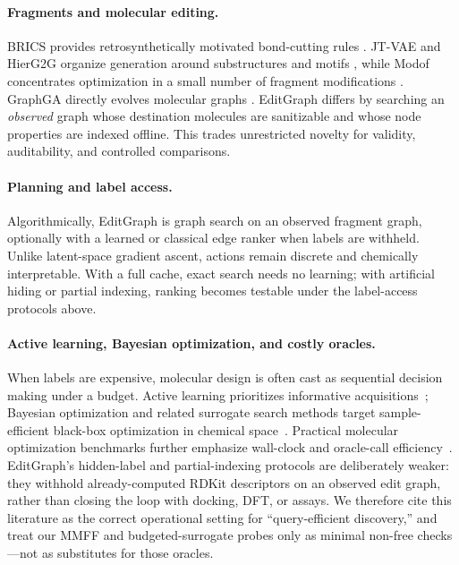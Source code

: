\documentclass[journal=jcisd8,manuscript=article,email=false]{achemso}
\begin{document}
\paragraph{Fragments and molecular editing.}
BRICS provides retrosynthetically motivated bond-cutting rules \citep{degen2008brics}. JT-VAE and HierG2G organize generation around substructures and motifs \citep{jin2018jtvae,jin2020hierg2g}, while Modof concentrates optimization in a small number of fragment modifications \citep{chen2021modof}. GraphGA directly evolves molecular graphs \citep{jensen2019graphga}. EditGraph differs by searching an \emph{observed} graph whose destination molecules are sanitizable and whose node properties are indexed offline. This trades unrestricted novelty for validity, auditability, and controlled comparisons.

\paragraph{Planning and label access.}
Algorithmically, EditGraph is graph search on an observed fragment graph, optionally with a learned or classical edge ranker when labels are withheld. Unlike latent-space gradient ascent, actions remain discrete and chemically interpretable. With a full cache, exact search needs no learning; with artificial hiding or partial indexing, ranking becomes testable under the label-access protocols above.

\paragraph{Active learning, Bayesian optimization, and costly oracles.}
When labels are expensive, molecular design is often cast as sequential decision making under a budget. Active learning prioritizes informative acquisitions~\citep{settles2009active,reker2015active,graff2021accelerating}; Bayesian optimization and related surrogate search methods target sample-efficient black-box optimization in chemical space~\citep{hernandez2017parallel,korovina2020chembo,griffiths2020constrained,tripp2021sample}. Practical molecular optimization benchmarks further emphasize wall-clock and oracle-call efficiency~\citep{gao2022pmo}. EditGraph's hidden-label and partial-indexing protocols are deliberately weaker: they withhold already-computed RDKit descriptors on an observed edit graph, rather than closing the loop with docking, DFT, or assays. We therefore cite this literature as the correct operational setting for ``query-efficient discovery,'' and treat our MMFF and budgeted-surrogate probes only as minimal non-free checks---not as substitutes for those oracles.
\end{document}
